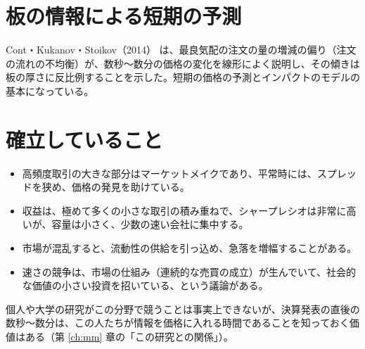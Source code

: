 \section{板の情報による短期の予測}

Cont・Kukanov・Stoikov（2014）\cite{cks2014} は、最良気配の注文の量の増減の偏り（注文の流れの不均衡）が、数秒〜数分の価格の変化を線形によく説明し、その傾きは板の厚さに反比例することを示した。短期の価格の予測とインパクトのモデルの基本になっている。

\section{確立していること}

\begin{keybox}[まとめ]
\begin{itemize}
\item 高頻度取引の大きな部分はマーケットメイクであり、平常時には、スプレッドを狭め、価格の発見を助けている。
\item 収益は、極めて多くの小さな取引の積み重ねで、シャープレシオは非常に高いが、容量は小さく、少数の速い会社に集中する。
\item 市場が混乱すると、流動性の供給を引っ込め、急落を増幅することがある。
\item 速さの競争は、市場の仕組み（連続的な売買の成立）が生んでいて、社会的な価値の小さい投資を招いている、という議論がある。
\end{itemize}
\end{keybox}

個人や大学の研究がこの分野で競うことは事実上できないが、決算発表の直後の数秒〜数分は、この人たちが情報を価格に入れる時間であることを知っておく価値はある（第 \ref{ch:mm} 章の「この研究との関係」）。
